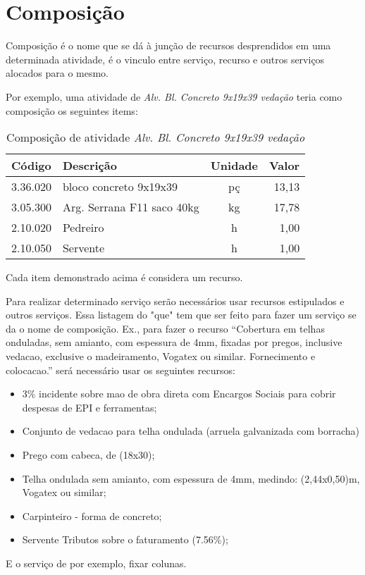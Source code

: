 \chapter{Composição}

Composição é o nome que se dá à junção de recursos desprendidos em uma determinada atividade, é o vinculo entre serviço, recurso e outros serviços alocados para o mesmo.

Por exemplo, uma atividade de \emph{Alv. Bl. Concreto 9x19x39 vedação} teria como composição os seguintes items:

\begin{table}[h]
	\centering
	\begin{tabular}{|l|l|c|r|}
	\hline
	Código&			Descrição&						Unidade&		Valor 	\\ \hline
	3.36.020&		bloco concreto 9x19x39&			pç&				13,13	\\ \hline
	3.05.300&		Arg. Serrana F11 saco 40kg&		kg&				17,78	\\ \hline
	2.10.020&		Pedreiro&						h&				 1,00	\\ \hline
	2.10.050&		Servente&						h&				 1,00	\\ \hline
	\end{tabular}
	\caption{Composição de atividade \emph{Alv. Bl. Concreto 9x19x39 vedação}}
	\label{tab:composicao}
\end{table}

Cada item demonstrado acima é considera um recurso.

Para realizar determinado serviço serão necessários usar recursos estipulados e outros serviços. Essa listagem do "que" tem que ser feito para fazer um serviço se da o nome de composição. Ex., para fazer o recurso ``Cobertura em telhas onduladas, sem amianto, com espessura de 4mm, fixadas por pregos, inclusive vedacao, exclusive o madeiramento, Vogatex ou similar. Fornecimento e colocacao.'' será necessário usar os seguintes recursos:

\begin{itemize}
	\item 3\% incidente sobre mao de obra direta com Encargos Sociais para cobrir despesas de EPI e ferramentas;
	\item Conjunto de vedacao para telha ondulada (arruela galvanizada com borracha)
	\item Prego com cabeca, de (18x30);
	\item Telha ondulada sem amianto, com espessura de 4mm, medindo: (2,44x0,50)m, Vogatex ou similar;
	\item Carpinteiro - forma de concreto;
	\item Servente Tributos sobre o faturamento (7.56\%);
\end{itemize}

E o serviço de por exemplo, fixar colunas.